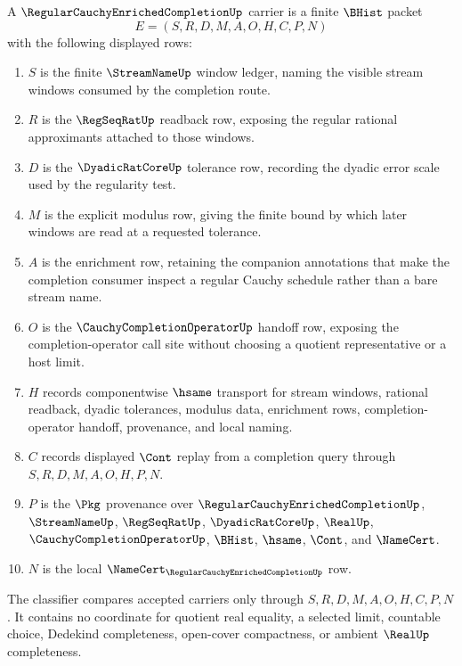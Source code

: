 \begin{definition}
\label{def:regular-cauchy-enriched-completion-carrier}
A $\RegularCauchyEnrichedCompletionUp$ carrier is a finite $\BHist$ packet
$$
E=(S,R,D,M,A,O,H,C,P,N)
$$
with the following displayed rows:
\begin{enumerate}
\item $S$ is the finite $\StreamNameUp$ window ledger, naming the visible stream windows consumed by the completion route.
\item $R$ is the $\RegSeqRatUp$ readback row, exposing the regular rational approximants attached to those windows.
\item $D$ is the $\DyadicRatCoreUp$ tolerance row, recording the dyadic error scale used by the regularity test.
\item $M$ is the explicit modulus row, giving the finite bound by which later windows are read at a requested tolerance.
\item $A$ is the enrichment row, retaining the companion annotations that make the completion consumer inspect a regular Cauchy schedule rather than a bare stream name.
\item $O$ is the $\CauchyCompletionOperatorUp$ handoff row, exposing the completion-operator call site without choosing a quotient representative or a host limit.
\item $H$ records componentwise $\hsame$ transport for stream windows, rational readback, dyadic tolerances, modulus data, enrichment rows, completion-operator handoff, provenance, and local naming.
\item $C$ records displayed $\Cont$ replay from a completion query through $S,R,D,M,A,O,H,P,N$.
\item $P$ is the $\Pkg$ provenance over $\RegularCauchyEnrichedCompletionUp$, $\StreamNameUp$, $\RegSeqRatUp$, $\DyadicRatCoreUp$, $\RealUp$, $\CauchyCompletionOperatorUp$, $\BHist$, $\hsame$, $\Cont$, and $\NameCert$.
\item $N$ is the local $\NameCert_{\RegularCauchyEnrichedCompletionUp}$ row.
\end{enumerate}
The classifier compares accepted carriers only through $S,R,D,M,A,O,H,C,P,N$. It contains no coordinate for quotient real equality, a selected limit, countable choice, Dedekind completeness, open-cover compactness, or ambient $\RealUp$ completeness.
\end{definition}

